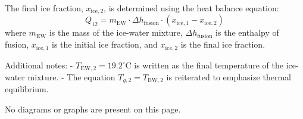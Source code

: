 The final ice fraction, \( x_{\text{ice},2} \), is determined using the heat balance equation:  
\[
Q_{12} = m_{\text{EW}} \cdot \Delta h_{\text{fusion}} \cdot (x_{\text{ice},1} - x_{\text{ice},2})
\]  
where \( m_{\text{EW}} \) is the mass of the ice-water mixture, \( \Delta h_{\text{fusion}} \) is the enthalpy of fusion, \( x_{\text{ice},1} \) is the initial ice fraction, and \( x_{\text{ice},2} \) is the final ice fraction.  

Additional notes:  
- \( T_{\text{EW},2} = 19.2^\circ\text{C} \) is written as the final temperature of the ice-water mixture.  
- The equation \( T_{g,2} = T_{\text{EW},2} \) is reiterated to emphasize thermal equilibrium.  

No diagrams or graphs are present on this page.